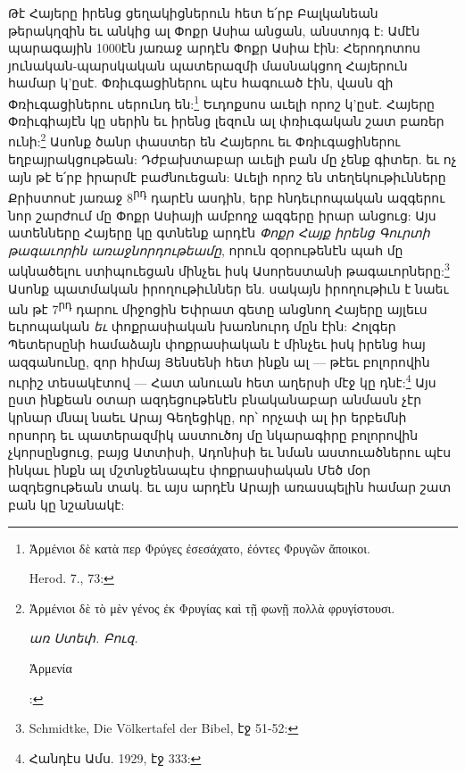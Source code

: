 \documentclass{article}
\begin{document}
{Թէ Հայերը իրենց ցեղակիցներուն հետ ե՛րբ Բալկանեան թերակղզին եւ անկից ալ Փոքր Ասիա անցան, անստոյգ է: Ամէն պարագային 1000էն յառաջ արդէն Փոքր Ասիա էին: Հերոդոտոս յունական-պարսկական պատերազմի մասնակցող Հայերուն համար կ'ըսէ. Փռիւգացիներու պէս հագուած էին, վասն զի Փռիւգացիներու սերունդ են:\footnote{\begin{greek}Ἀρμένιοι δὲ κατὰ περ Φρύγες ἐσεσάχατο, ἐόντες Φρυγῶν ἄποικοι.\end{greek} Herod. 7., 73:} Եւդոքսոս աւելի որոշ կ'ըսէ. Հայերը Փռիւգիայէն կը սերին եւ իրենց լեզուն ալ փռիւգական շատ բառեր ունի:\footnote{\begin{greek}Ἀρμένιοι δὲ τὸ μὲν γένος ἐκ Φρυγίας καὶ τῇ φωνῇ πολλὰ φρυγίστουσι.\end{greek} \emph{առ Ստեփ. Բուզ.} \begin{greek}Ἀρμενία\end{greek}:} Ասոնք ծանր փաստեր են Հայերու եւ Փռիւգացիներու եղբայրակցութեան: Դժբախտաբար աւելի բան մը չենք գիտեր. եւ ոչ այն թէ ե՛րբ իրարմէ բաժնուեցան: Աւելի որոշ են տեղեկութիւնները Քրիստոսէ յառաջ 8\textsuperscript{րդ} դարէն ասդին, երբ հնդեւրոպական ազգերու նոր շարժում մը Փոքր Ասիայի ամբողջ ազգերը իրար անցուց: Այս ատենները Հայերը կը գտնենք արդէն \emph{Փոքր Հայք իրենց Գուրտի թագաւորին առաջնորդութեամը}, որուն զօրութենէն պահ մը ակնածելու ստիպուեցան մինչեւ իսկ Ասորեստանի թագաւորները:\footnote{Schmidtke, Die Völkertafel der Bibel, էջ 51-52:} Ասոնք պատմական իրողութիւններ են. սակայն իրողութիւն է նաեւ ան թէ 7\textsuperscript{րդ} դարու միջոցին Եփրատ գետը անցնող Հայերը այլեւս եւրոպական \emph{եւ} փոքրասիական խառնուրդ մըն էին: Հոլգեր Պետերսընի համաձայն փոքրասիական է մինչեւ իսկ իրենց հայ ազգանունը, զոր հիմայ Յենսենի հետ ինքն ալ — թէեւ բոլորովին ուրիշ տեսակէտով — Հատ անուան հետ աղերսի մէջ կը դնէ:\footnote{Հանդէս Ամս. 1929, էջ 333:} Այս ըստ ինքեան օտար ազդեցութենէն բնականաբար անմասն չէր կրնար մնալ նաեւ Արայ Գեղեցիկը, որ՝ որչափ ալ իր երբեմնի որսորդ եւ պատերազմիկ աստուծոյ մը նկարագիրը բոլորովին չկորսընցուց, բայց Ատտիսի, Ադոնիսի եւ նման աստուածներու պէս ինկաւ ինքն ալ մշտնջենապէս փոքրասիական Մեծ մօր ազդեցութեան տակ. եւ այս արդէն Արայի առասպելին համար շատ բան կը նշանակէ:}
\clearpage
\end{document}
